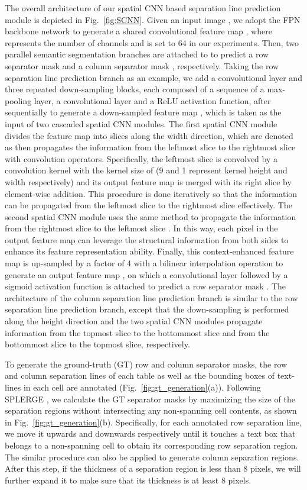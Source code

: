 \documentclass[final,3p,times,twocolumn]{elsarticle}
\begin{document}
The overall architecture of our spatial CNN based separation line prediction module is depicted in Fig.~\ref{fig:SCNN}. Given an input image , we adopt the FPN backbone network to generate a shared convolutional feature map , where  represents the number of channels and is set to 64 in our experiments. Then, two parallel semantic segmentation branches are attached to  to predict a row separator mask  and a column separator mask , respectively. Taking the row separation line prediction branch as an example, we add a  convolutional layer and three repeated down-sampling blocks, each composed of a sequence of a  max-pooling layer, a  convolutional layer and a ReLU activation function, after  sequentially to generate a down-sampled feature map , which is taken as the input of two cascaded spatial CNN modules. The first spatial CNN module divides the feature map into  slices along the width direction, which are denoted as  then propagates the information from the leftmost slice  to the rightmost slice  with convolution operators. Specifically, the leftmost slice  is convolved by a convolution kernel with the kernel size of  (9 and 1 represent kernel height and width respectively) and its output feature map is merged with its right slice  by element-wise addition. This procedure is done iteratively so that the information can be propagated from the leftmost slice to the rightmost slice effectively. The second spatial CNN module uses the same method to propagate the information from the rightmost slice  to the leftmost slice . In this way, each pixel in the output feature map can leverage the structural information from both sides to enhance its feature representation ability. Finally, this context-enhanced feature map is up-sampled by a factor of 4 with a bilinear interpolation operation to generate an output feature map , on which a  convolutional layer followed by a sigmoid activation function is attached to predict a row separator mask . The architecture of the column separation line prediction branch is similar to the row separation line prediction branch, except that the down-sampling is performed along the height direction and the two spatial CNN modules propagate information from the topmost slice to the bottommost slice and from the bottommost slice to the topmost slice, respectively.

To generate the ground-truth (GT) row and column separator masks, the row and column separation lines of each table as well as the bounding boxes of text-lines in each cell are annotated (Fig.~\ref{fig:gt_generation}(a)). Following SPLERGE \cite{tensmeyer2019deep}, we calculate the GT separator masks by maximizing the size of the separation regions without intersecting any non-spanning cell contents, as shown in Fig.~\ref{fig:gt_generation}(b). Specifically, for each annotated row separation line, we move it upwards and downwards respectively until it touches a text box that belongs to a non-spanning cell to obtain its corresponding row separation region. The similar procedure can also be applied to generate column separation regions. After this step, if the thickness of a separation region is less than 8 pixels, we will further expand it to make sure that its thickness is at least 8 pixels.
\end{document}
